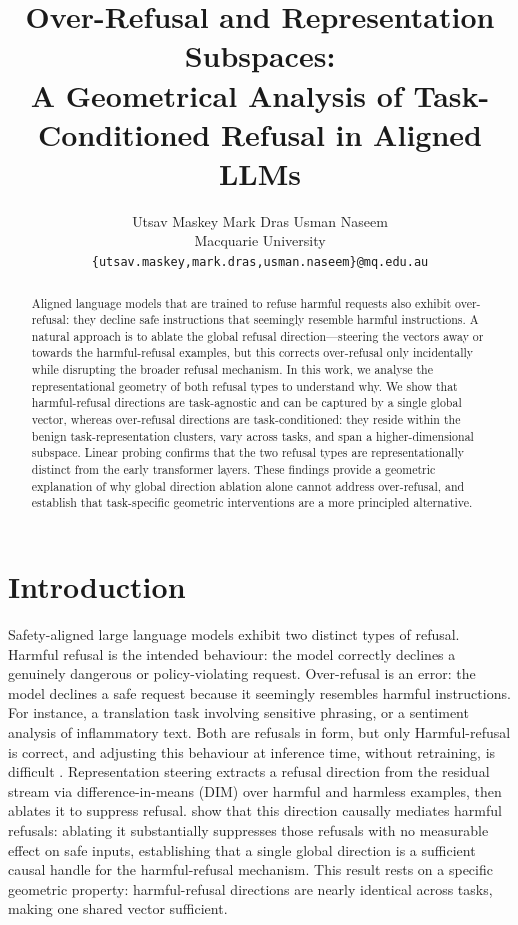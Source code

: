 \documentclass[11pt]{article}
\title{Over-Refusal and Representation Subspaces:\\
A Geometrical Analysis of Task-Conditioned Refusal in Aligned LLMs}
\author{
  Utsav Maskey \quad
  Mark Dras \quad
  Usman Naseem \\
  Macquarie University \\
  \texttt{\{utsav.maskey,mark.dras,usman.naseem\}@mq.edu.au}
}
\begin{document}
\maketitle

\begin{abstract}
Aligned language models that are trained to refuse harmful requests also exhibit
over-refusal: they decline safe instructions that seemingly resemble
harmful instructions.
A natural approach is to ablate the global refusal direction---steering the vectors
away or towards the harmful-refusal examples, but this corrects over-refusal only
incidentally while disrupting the broader refusal mechanism.
In this work, we analyse the representational geometry of both refusal types to understand why.
We show that harmful-refusal directions are task-agnostic and can be captured by a single global vector, whereas
over-refusal directions are task-conditioned: they reside within the benign task-representation clusters, vary across tasks, and span a
higher-dimensional subspace.
Linear probing confirms that the two refusal types are representationally
distinct from the early transformer layers.
These findings provide a geometric explanation of why global direction ablation alone
cannot address over-refusal, and establish that task-specific geometric interventions
are a more principled alternative.
\end{abstract}

\section{Introduction}

Safety-aligned large language models exhibit two distinct types of refusal.
Harmful refusal is the intended behaviour: the model correctly declines a
genuinely dangerous or policy-violating request.
Over-refusal is an error: the model declines a safe request because it
seemingly resembles harmful instructions. For instance, a translation task
involving sensitive phrasing, or a sentiment analysis of inflammatory text.
Both are refusals in form, but only Harmful-refusal is correct, and adjusting this behaviour
at inference time, without retraining, is difficult \citep{cui2025orbench, rottger2024xstest}.
Representation steering \citep{arditi2024refusal,zou2023representation} extracts
a refusal direction from the residual stream via difference-in-means (DIM) over
harmful and harmless examples, then ablates it to suppress refusal.
\citet{arditi2024refusal} show that this direction causally mediates harmful
refusals: ablating it substantially suppresses those refusals with no measurable
effect on safe inputs, establishing that a single global direction is a sufficient
causal handle for the harmful-refusal mechanism.
This result rests on a specific geometric property: harmful-refusal directions
are nearly identical across tasks, making one shared vector sufficient.
\end{document}
